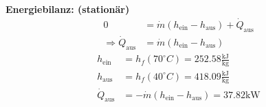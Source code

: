 

\item[a)] \textbf{Energiebilanz: (stationär)}
    \begin{align*}
        0 &= \dot{m} (h_{\text{ein}} - h_{\text{aus}}) + \dot{Q}_{\text{aus}} \\
        \Rightarrow \dot{Q}_{\text{aus}} &= \dot{m} (h_{\text{ein}} - h_{\text{aus}})
    \end{align*}
    \begin{align*}
        h_{\text{ein}} &= h_f (70^\circ C) = 252.58 \frac{\text{kJ}}{\text{kg}} \\
        h_{\text{aus}} &= h_f (40^\circ C) = 418.09 \frac{\text{kJ}}{\text{kg}} \\
        \dot{Q}_{\text{aus}} &= -\dot{m} (h_{\text{ein}} - h_{\text{aus}}) = 37.82 \text{kW}
    \end{align*}